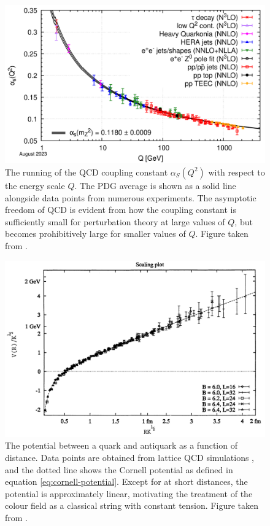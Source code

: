 \documentclass[12pt,a4paper]{report}
\begin{document}
\begin{figure}
  \centering
  \includegraphics[width=0.7\linewidth]{figures/running-coupling.png}
  \caption{The running of the QCD coupling constant $\alpha_S(Q^2)$ with respect to the energy scale $Q$. The PDG average is shown as a solid line alongside data points from numerous experiments. The asymptotic freedom of QCD is evident from how the coupling constant is sufficiently small for perturbation theory at large values of $Q$, but becomes prohibitively large for smaller values of $Q$. Figure taken from \cite{ParticleDataGroup:2024cfk}.}
  \label{fig:running-coupling}
\end{figure}

\begin{figure}
  \centering
  \includegraphics[width=0.7\linewidth]{figures/cornell-potential.png}
  \caption{The potential between a quark and antiquark as a function of distance. Data points are obtained from lattice QCD simulations \cite{Bali:1992ab}, and the dotted line shows the Cornell potential as defined in equation \eqref{eq:cornell-potential}. Except for at short distances, the potential is approximately linear, motivating the treatment of the colour field as a classical string with constant tension. Figure taken from \cite{Bali:1992ab}.}
  \label{fig:cornell-potential}
\end{figure}
\end{document}
